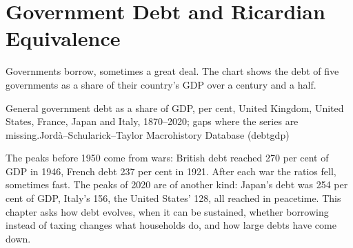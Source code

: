 \chapter{Government Debt and Ricardian Equivalence}\label{ch:b2:government-debt}

Governments borrow, sometimes a great deal. The chart shows the debt of five governments as a share of their country's
GDP over a century and a half.

\begin{openingchart}{General government debt as a share of GDP, per cent, United Kingdom, United States, France, Japan
  and Italy, 1870--2020; gaps where the series are missing.}{Jord\`a--Schularick--Taylor Macrohistory Database (debtgdp)}
\end{openingchart}

The peaks before 1950 come from wars: British debt reached 270 per cent of GDP in 1946, French debt 237 per cent in 1921. After each
war the ratios fell, sometimes fast. The peaks of 2020 are of another kind: Japan's debt was 254 per cent of GDP, Italy's 156,
the United States' 128, all reached in peacetime. This chapter asks how debt evolves, when it can be sustained, whether
borrowing instead of taxing changes what households do, and how large debts have come down.

